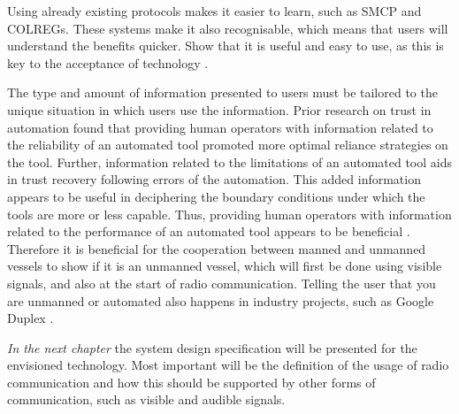 Using already existing protocols makes it easier to learn, such as \acf{SMCP} and \ac{COLREGs}. These systems make it also recognisable, which means that users will understand the benefits quicker. Show that it is useful and easy to use, as this is key to the acceptance of technology \cite{Davis1989}.

The type and amount of information presented to users must be tailored to the unique situation in which users use the information. Prior research on trust in automation found that providing human operators with information related to the reliability of an automated tool promoted more optimal reliance strategies on the tool. Further, information related to the limitations of an automated tool aids in trust recovery following errors of the automation. This added information appears to be useful in deciphering the boundary conditions under which the tools are more or less capable. Thus, providing human operators with information related to the performance of an automated tool appears to be beneficial \cite{Lyons2014}. Therefore it is beneficial for the cooperation between manned and unmanned vessels to show if it is an unmanned vessel, which will first be done using visible signals, and also at the start of radio communication. Telling the user that you are unmanned or automated also happens in industry projects, such as Google Duplex \cite{Nieva2018}.

\vspace{1.5cm}
\emph{In the next chapter} the system design specification will be presented for the envisioned technology. Most important will be the definition of the usage of radio communication and how this should be supported by other forms of communication, such as visible and audible signals.
